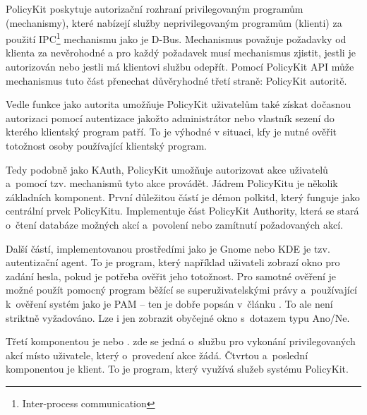 PolicyKit poskytuje autorizační rozhraní privilegovaným programům (mechanismy), které nabízejí služby neprivilegovaným programům (klienti) za použití IPC\footnote{Inter-process communication} mechanismu jako je D-Bus. Mechanismus považuje požadavky od klienta za nevěrohodné a pro každý požadavek musí mechanismus zjistit, jestli je autorizován nebo jestli má klientovi službu odepřít. Pomocí PolicyKit API může mechanismus tuto část přenechat důvěryhodné třetí straně: PolicyKit autoritě.\cite{manpolkit1}

Vedle funkce jako autorita umožňuje PolicyKit uživatelům také získat dočasnou autorizaci pomocí autentizace jakožto administrátor nebo vlastník sezení do kterého klientský program patří. To je výhodné v situaci, kfy je nutné ověřit totožnost osoby používající klientský program.\cite{manpolkit1}

Tedy podobně jako KAuth, PolicyKit umožňuje autorizovat akce uživatelů a~pomocí tzv. mechanismů tyto akce provádět. Jádrem PolicyKitu je několik základních komponent. První důležitou částí je démon polkitd, který funguje jako centrální prvek PolicyKitu. Implementuje část PolicyKit Authority, která se stará o~čtení databáze možných akcí a~povolení nebo zamítnutí požadovaných akcí.

Další částí, implementovanou prostředími jako je Gnome nebo KDE je tzv. autentizační agent. To je program, který například uživateli zobrazí okno pro zadání hesla, pokud je potřeba ověřit jeho totožnost. Pro samotné ověření je možné použít pomocný program běžící se superuživatelskými právy a~používající k~ověření systém jako je PAM -- ten je dobře popsán v~článku \cite{rootpam}. To ale není striktně vyžadováno. Lze i jen zobrazit obyčejné okno s~dotazem typu Ano/Ne.

Třetí komponentou je  nebo . zde se jedná o~službu pro vykonání privilegovaných akcí místo uživatele, který o~provedení akce žádá. Čtvrtou a~poslední komponentou je klient. To je program, který využívá služeb systému PolicyKit.

